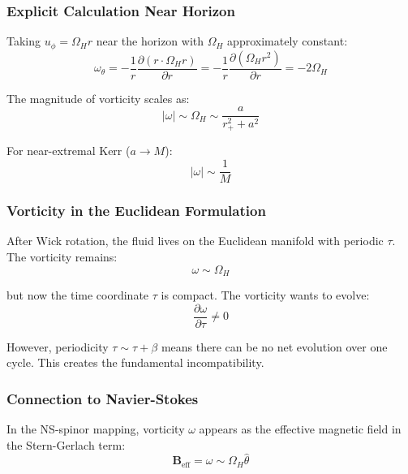 \documentclass[11pt]{article}
\begin{document}
\subsubsection{Explicit Calculation Near Horizon}

Taking $u_\phi = \Omega_H r$ near the horizon with $\Omega_H$ approximately constant:
\begin{equation}
\omega_\theta = -\frac{1}{r}\frac{\partial(r \cdot \Omega_H r)}{\partial r} = -\frac{1}{r}\frac{\partial(\Omega_H r^2)}{\partial r} = -2\Omega_H
\end{equation}

The magnitude of vorticity scales as:
\begin{equation}
|\omega| \sim \Omega_H \sim \frac{a}{r_+^2 + a^2}
\end{equation}

For near-extremal Kerr ($a \to M$):
\begin{equation}
|\omega| \sim \frac{1}{M}
\end{equation}

\subsubsection{Vorticity in the Euclidean Formulation}

After Wick rotation, the fluid lives on the Euclidean manifold with periodic $\tau$. The vorticity remains:
\begin{equation}
\omega \sim \Omega_H
\end{equation}

but now the time coordinate $\tau$ is compact. The vorticity wants to evolve:
\begin{equation}
\frac{\partial \omega}{\partial \tau} \neq 0
\end{equation}

However, periodicity $\tau \sim \tau + \beta$ means there can be no net evolution over one cycle. This creates the fundamental incompatibility.

\subsubsection{Connection to Navier-Stokes}

In the NS-spinor mapping, vorticity $\omega$ appears as the effective magnetic field in the Stern-Gerlach term:
\begin{equation}
\mathbf{B}_{\text{eff}} = \omega \sim \Omega_H \hat{\theta}
\end{equation}
\end{document}

